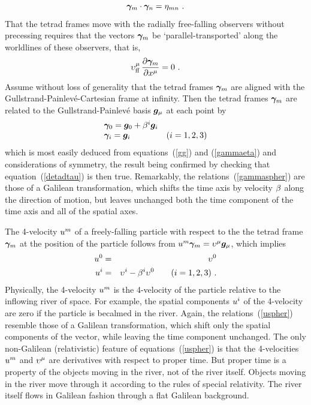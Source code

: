 \documentclass[twocolumn,showpacs,preprintnumbers,amsmath,amssymb,prb]{revtex4}
\begin{document}
\begin{equation}
\label{gammaeta}
  \bm{\gamma}_m \cdot \bm{\gamma}_n = \eta_{mn}
  \ .
\end{equation}
That the tetrad frames move with the radially free-falling observers
without precessing requires that the vectors $\bm{\gamma}_m$
be `parallel-transported'
along the worldlines of these observers,
that is,
\begin{equation}
\label{detadtau}
  \upsilon_{\rm ff}^\mu \, {\partial \bm{\gamma}_m \over \partial x^\mu} = 0
  \ .
\end{equation}
Assume without loss of generality
that the tetrad frames $\bm{\gamma}_m$
are aligned with the Gullstrand-Painlev\'e-Cartesian frame at infinity.
Then the tetrad frames $\bm{\gamma}_m$
are related to
the Gullstrand-Painlev\'e basis $\bm{g}_\mu$ at each point by
\begin{equation}
\label{gammaspher}
  \begin{array}{ll}
  \bm{\gamma}_0 = \bm{g}_0 + \beta^i \bm{g}_i & \\
  \bm{\gamma}_i = \bm{g}_i & (i = 1,2,3)
  \end{array}
\end{equation}
which is most easily deduced from
equations~(\ref{gg}) and (\ref{gammaeta}) and considerations of symmetry,
the result being confirmed by checking that equation~(\ref{detadtau})
is then true.
Remarkably,
the relations~(\ref{gammaspher})
are those of a Galilean transformation,
which shifts the time axis by velocity $\beta$ along the direction of motion,
but leaves unchanged
both the time component of the time axis
and all of the spatial axes.

The 4-velocity $u^m$ of a freely-falling particle with respect to the
the tetrad frame $\bm{\gamma}_m$ at the position of the particle follows from
$u^m \bm{\gamma}_m = \upsilon^\mu \bm{g}_\mu$,
which implies
\begin{eqnarray}
\label{uspher}
  u^0 &=& \upsilon^0
\nonumber
\\
  u^i &=& \upsilon^i - \beta^i \upsilon^0
  \qquad (i = 1,2,3) \ .
\end{eqnarray}
Physically,
the 4-velocity $u^m$ is the 4-velocity of the particle relative
to the inflowing river of space.
For example,
the spatial components $u^i$ of the 4-velocity
are zero if the particle is becalmed in the river.
Again, the relations~(\ref{uspher})
resemble those of a Galilean transformation,
which shift only the spatial components of the vector,
while leaving the time component unchanged.
The only non-Galilean (relativistic) feature of equations~(\ref{uspher})
is that the 4-velocities $u^m$ and $\upsilon^\mu$
are derivatives with respect to proper time.
But proper time is a property of the objects moving in the river,
not of the river itself.
Objects moving in the river move through it
according to the rules of special relativity.
The river itself flows in Galilean fashion through a flat Galilean background.
\end{document}
